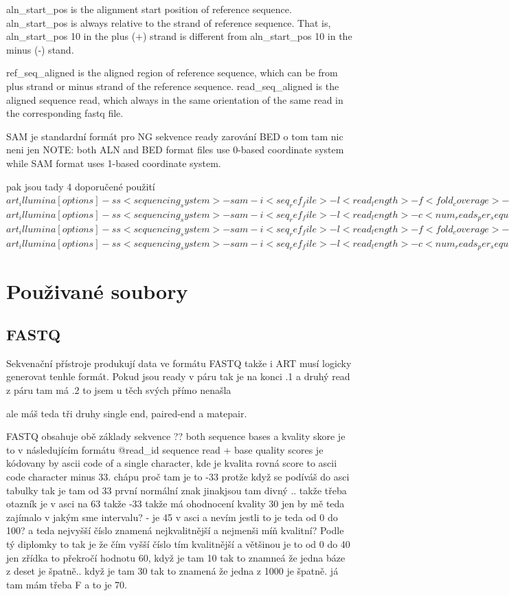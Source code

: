\documentclass[czech,DP]{thesiskiv}
\numberwithin{equation}{section}
\begin{document}
		
			    
	    
	       	
		aln\_start\_pos is the alignment start position of reference sequence. aln\_start\_pos is always relative to the strand of reference sequence. That is, aln\_start\_pos 10 in the plus (+) strand is different from aln\_start\_pos 10 in the minus (‐) stand.  
	
		ref\_seq\_aligned is the aligned region of reference sequence, which can be from plus strand or minus strand of the reference sequence. 
		read\_seq\_aligned is the aligned sequence read, which always in the same orientation of the same read in the corresponding fastq file. 

SAM je standardní formát pro NG sekvence ready zarování
BED o tom tam nic neni jen 
NOTE: both ALN and BED format files use 0-based coordinate system while SAM format uses 1-based coordinate system.

pak jsou tady 4 doporučené použití
$art_illumina [options] -ss <sequencing_system> -sam -i <seq_ref_file> -l <read_length> -f <fold_coverage> -o <outfile_prefix>$
$art_illumina [options] -ss <sequencing_system> -sam -i <seq_ref_file> -l <read_length> -c <num_reads_per_sequence> -o <outfile_prefix>$
$art_illumina [options] -ss <sequencing_system> -sam -i <seq_ref_file> -l <read_length> -f <fold_coverage> -m <mean_fragsize> -s <std_fragsize> -o <outfile_prefix>$
$art_illumina [options] -ss <sequencing_system> -sam -i <seq_ref_file> -l <read_length> -c <num_reads_per_sequence> -m <mean_fragsize> -s <std_fragsize> -o <outfile_prefix>$


\section{Použivané soubory}

\subsection{FASTQ}
Sekvenační přístroje produkují data ve formátu FASTQ takže i ART musí logicky generovat tenhle formát.
Pokud jsou ready v páru tak je na konci .1
a druhý read z páru tam má .2 to jsem u těch svých přímo nenašla 

ale máš teda tři druhy single end, paired-end a matepair. 

FASTQ obsahuje obě základy sekvence ?? both sequence bases a kvality skore je to v následujícím formátu
@read\_id
sequence read
+
base quality scores je kódovany by ascii code of a single character, kde je kvalita rovná score to ascii code character minus 33. chápu proč tam je to -33 protže když se podíváš do asci tabulky tak je tam od 33 první normální znak jinakjsou tam divný .. 
takže třeba otazník je v asci na 63 takže -33 takže má ohodnocení kvality 30
jen by mě teda zajímalo v jakým sme intervalu? - je 45 v asci a nevím jestli to je teda od 0 do 100?  a teda nejvyšší číslo znamená nejkvalitnější a nejmenši míň kvalitní? Podle tý diplomky to tak je že čím vyšší číslo tím kvalitnější a většinou je to od 0 do 40 jen zřídka to překročí hodnotu 60, když je tam 10 tak to znamneá že jedna báze z deset je špatně.. když je tam 30 tak to znamená že jedna z 1000 je špatně.
já tam mám třeba F a to je 70.
\end{document}
